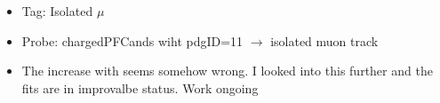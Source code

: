 \documentclass{beamer}
\begin{document}
\begin{frame}
\begin{columns}
\begin{column}{0.33\textwidth}
   \end{column}
  \end{columns}
\begin{itemize}
 \item Tag: Isolated $\mu$
 \item Probe: chargedPFCands wiht pdgID=11 $\rightarrow$ isolated muon track
 \item The increase with \pt seems somehow wrong. I looked into this further and the fits are in improvalbe status. Work ongoing
\end{itemize}
\end{frame}
\end{document}
